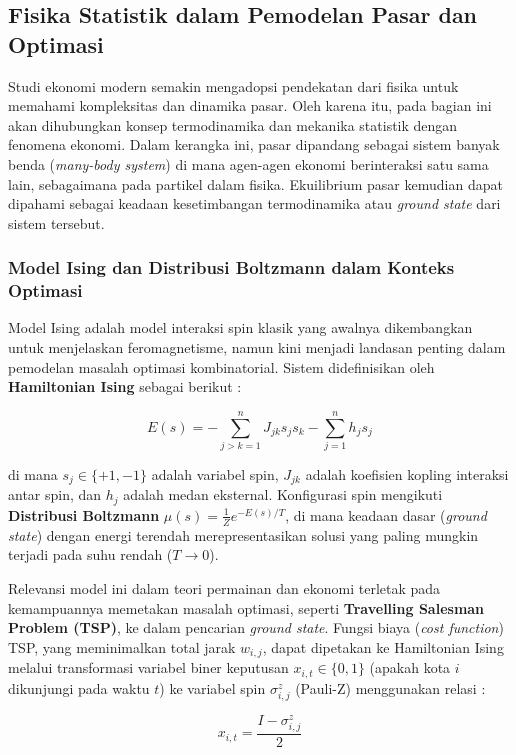 \subsection{Fisika Statistik dalam Pemodelan Pasar dan Optimasi}
Studi ekonomi modern semakin mengadopsi pendekatan dari fisika untuk memahami kompleksitas dan dinamika pasar. Oleh karena itu, pada bagian ini akan dihubungkan konsep termodinamika dan mekanika statistik dengan fenomena ekonomi. Dalam kerangka ini, pasar dipandang sebagai sistem banyak benda (\textit{many-body system}) di mana agen-agen ekonomi berinteraksi satu sama lain, sebagaimana pada partikel dalam fisika. Ekuilibrium pasar kemudian dapat dipahami sebagai keadaan kesetimbangan termodinamika atau \textit{ground state} dari sistem tersebut.

\subsubsection{Model Ising dan Distribusi Boltzmann dalam Konteks Optimasi}

Model Ising adalah model interaksi spin klasik yang awalnya dikembangkan untuk menjelaskan feromagnetisme, namun kini menjadi landasan penting dalam pemodelan masalah optimasi kombinatorial. Sistem didefinisikan oleh \textbf{Hamiltonian Ising} sebagai berikut \citep{layden_quantum-enhanced_2022}:

\[ E(s) = - \sum_{j>k=1}^n J_{jk}s_j s_k - \sum_{j=1}^n h_j s_j \]

di mana $s_j \in \{+1, -1\}$ adalah variabel spin, $J_{jk}$ adalah koefisien kopling interaksi antar spin, dan $h_j$ adalah medan eksternal. Konfigurasi spin mengikuti \textbf{Distribusi Boltzmann} $\mu(s) = \frac{1}{Z} e^{-E(s)/T}$, di mana keadaan dasar (\textit{ground state}) dengan energi terendah merepresentasikan solusi yang paling mungkin terjadi pada suhu rendah ($T \to 0$). 

Relevansi model ini dalam teori permainan dan ekonomi terletak pada kemampuannya memetakan masalah optimasi, seperti \textbf{Travelling Salesman Problem (TSP)}, ke dalam pencarian \textit{ground state}. Fungsi biaya (\textit{cost function}) TSP, yang meminimalkan total jarak $w_{i,j}$, dapat dipetakan ke Hamiltonian Ising melalui transformasi variabel biner keputusan $x_{i,t} \in \{0, 1\}$ (apakah kota $i$ dikunjungi pada waktu $t$) ke variabel spin $\sigma_{i,j}^z$ (Pauli-Z) menggunakan relasi \citep{sinaga_important_2023}:

\[ x_{i,t} = \frac{I - \sigma_{i,j}^z}{2} \]

